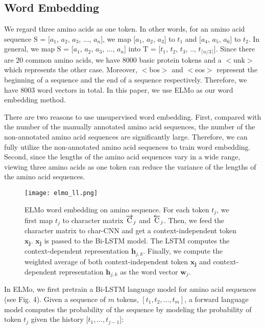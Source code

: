 \documentclass{article}
\begin{document}
    \subsection{Word Embedding}
        We regard three amino acids as one token. In other words, for an amino acid sequence $\mbox{S}$ = [$a_{1}$, $a_{2}$, $a_{3}$, ..., $a_{n}$], we map $[a_{1}$, $a_{2}$, $a_{3}]$ to $t_{1}$ and $[a_{4}$, $a_{5}$, $a_{6}]$ to $t_{2}$. In general, we map $\mbox{S}$ = [$a_{1}$, $a_{2}$, $a_{3}$, ..., $a_{n}$] into $\mbox{T}$ = [$t_{1}$, $t_{2}$, $t_{3}$, .., $t_{\lceil n/3 \rceil}$]. Since there are 20 common amino acids, we have 8000 basic protein tokens and a $<$unk$>$ which represents the other case. Moreover, $<$bos$>$ and $<$eos$>$ represent the beginning of a sequence and the end of a sequence respectively. Therefore, we have 8003 word vectors in total. In this paper, we use ELMo as our word embedding method. 

        There are two reasons to use unsupervised word embedding. First, compared with the number of the manually annotated amino acid sequences, the number of the non-annotated amino acid sequences are significantly large. Therefore, we can fully utilize the non-annotated amino acid sequences to train word embedding. Second, since the lengths of the amino acid sequences vary in a wide range, viewing three amino acids as one token can reduce the variance of the lengths of the amino acid sequences.
        
        \begin{figure}[h]
        	\texttt{[image: elmo\_ll.png]}
        	\centering
        	\caption{
            	ELMo word embedding on amino sequence. For each token $t_{j}$, we first map $t_{j}$ to character matrix $\protect{\overrightarrow{\mbox{C}}}_{j}$ and $\protect{\overleftarrow{\mbox{C}}}_{j}$. Then, we feed the character matrix to char-CNN and get a context-independent token $\mathbf{x_{j}}$. $\mathbf{x_{j}}$ is passed to the Bi-LSTM model. The LSTM computes the context-dependent representation ${\mathbf{h}}_{j, k}$. Finally, we compute the weighted average of both context-independent token $\mathbf{x_{j}}$ and context-dependent representation ${\mathbf{h}}_{j, k}$ as the word vector ${\mathbf{w}}_{j}$.
        	}
        \end{figure}

        In ELMo, we first pretrain a Bi-LSTM language model for amino acid sequences (see Fig. 4). Given a sequence of $m$ tokens, $[t_{1}, t_{2}, ..., t_{m}]$, a forward language model computes the probability of the sequence by modeling the probability of token $t_{j}$ given the history $\big[t_{1}, ..., t_{j - 1}\big]$:
\end{document}
